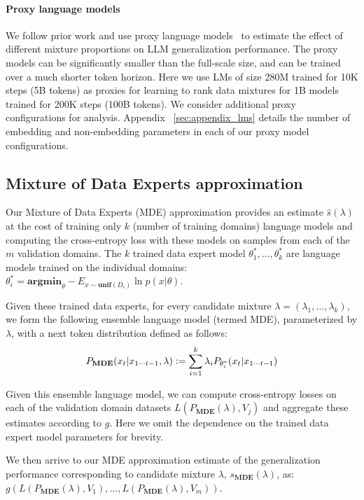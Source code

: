 \paragraph{Proxy language models} We follow prior work and use proxy language models~\cite{doremi} to estimate the effect of different mixture proportions on LLM generalization performance. The proxy models can be significantly smaller than the full-scale size, and can be trained over a much shorter token horizon. Here we use  LMs of size 280M trained for 10K steps (5B tokens) as proxies for learning to rank data mixtures for 1B models trained for 200K steps (100B tokens). We consider additional proxy configurations for analysis. Appendix ~\ref{sec:appendix_lms} details the number of embedding and non-embedding parameters in each of our proxy model configurations.

\subsection{Mixture of Data Experts approximation}


Our Mixture of Data Experts (MDE) approximation provides an estimate $\hat{s}(\lambda)$ at the cost of training only $k$ (number of training domains) language models and computing the cross-entropy loss with these models on samples from each of the $m$ validation domains. The $k$ trained data expert model  $\theta^{*}_1,\ldots,\theta^{*}_k$ are language models trained on the individual domains: $ \theta^{*}_i = \mathbf{argmin}_\theta - E_{x \sim \mathbf{unif}(D_i)}\ln p(x|\theta)$.

Given these trained data experts, for every candidate mixture $\lambda = (\lambda_1,\ldots,\lambda_k)$, we form the following ensemble language model (termed MDE), parameterized by $\lambda$, with a next token distribution defined as follows:
\[ P_{\mathbf{MDE}}(x_t|x_{1\cdots{t-1}},\lambda ) \vcentcolon= \sum_{i=1}^k {\lambda}_i P_{\theta^{*}_i}(x_t|x_{1\cdots{t-1}}) \]

Given this ensemble language model, we can compute cross-entropy losses on each of the validation domain datasets $L(P_{\mathbf{MDE}}(\lambda),V_j)$ and aggregate these estimates according to $g$.  Here we omit the dependence on the trained data expert model parameters for brevity.

We then arrive to our MDE approximation estimate of the generalization performance corresponding to candidate mixture $\lambda$, $s_{\mathbf{MDE}}(\lambda)$,  as:
\mbox{$g(L(P_{\mathbf{MDE}}(\lambda),V_1), \ldots, L(P_{\mathbf{MDE}}(\lambda),V_m))$}.

